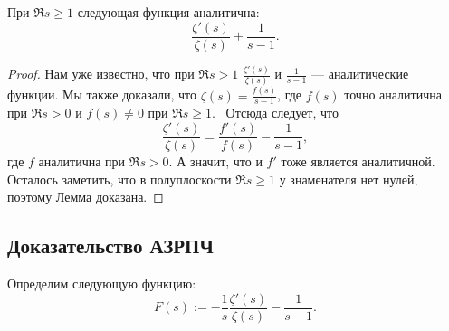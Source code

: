 \begin{nlemma}
\label{lm:I-10}
    При $\Re{s} \ge 1$ следующая функция аналитична:
    \[
        \frac{\zeta'(s)}{\zeta(s)} + \frac{1}{s-1}.
    \]
\end{nlemma}
\begin{proof}
    Нам уже известно, что при $\Re{s} > 1$ $\frac{\zeta'(s)}{\zeta(s)}$ и $\frac{1}{s-1}$ --- аналитические функции. Мы также доказали, что $\zeta(s) = \frac{f(s)}{s-1}$, где $f(s)$ точно аналитична при $\Re{s} > 0$ и $f(s) \ne 0$ при $\Re{s} \ge 1$.~\newline
    Отсюда следует, что 
    \[
        \frac{\zeta'(s)}{\zeta(s)} = \frac{f'(s)}{f(s)} - \frac{1}{s-1},
    \]
    где $f$ аналитична при $\Re{s} > 0$. А значит, что и $f'$ тоже является аналитичной. Осталось заметить, что в полуплоскости $\Re{s} \ge 1$ у знаменателя нет нулей, поэтому Лемма доказана.
\end{proof}


\subsection{Доказательство АЗРПЧ}
\label{subsec:I-5}

\begin{ndefinition}
\label{def:I_F-function}
    Определим следующую функцию:
    \[
        F(s) := -\frac{1}{s}\frac{\zeta'(s)}{\zeta(s)} - \frac{1}{s-1}.
    \]
\end{ndefinition}

